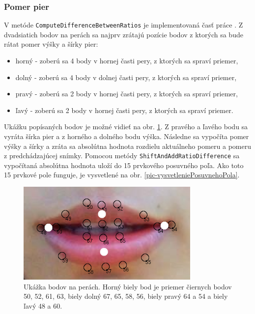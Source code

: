 \subsubsection{Pomer pier}\label{pomerPier}
V metóde \texttt{ComputeDifferenceBetweenRatios} je implementovaná časť práce \cite{aoki2007voice}.
Z dvadsiatich bodov na perách sa najprv zrátajú pozície bodov z ktorých sa bude rátat pomer výšky a šírky pier:
\begin{itemize}
\item horný - zoberú sa 4 body v hornej časti pery, z ktorých sa spraví priemer,
\item dolný - zoberú sa 4 body v dolnej časti pery, z ktorých sa spraví priemer,
\item pravý - zoberú sa 2 body v hornej časti pery, z ktorých sa spraví priemer,
\item ľavý - zoberú sa 2 body v hornej časti pery, z ktorých sa spraví priemer.
\end{itemize} 
Ukážku popísaných bodov je možné vidieť na obr. \ref{pic-bodyPomeru}.
Z pravého a ľavého bodu sa vyráta šírka pier a z horného a dolného bodu výška.
Následne sa vypočíta pomer výšky a šírky a zráta sa absolútna hodnota rozdielu aktuálneho pomeru a pomeru z predchádzajúcej snímky. 
Pomocou metódy \texttt{ShiftAndAddRatioDifference} sa vypočítaná absolútna hodnota uloží do 15 prvkového posuvného poľa.
Ako toto 15 prvkové pole funguje, je vysvetlené na obr. \ref{pic-vysvetleniePosuvnehoPola}.

\begin{figure}[H]
	\begin{center}
		\includegraphics[height=5cm]{pics/peryBodyUpravene.png}
		\caption{Ukážka bodov na perách. Horný biely bod je priemer čiernych bodov 50, 52, 61, 63, biely dolný 67, 65, 58, 56, biely pravý 64 a 54 a biely ľavý 48 a 60.}
		\label{pic-bodyPomeru}
	\end{center}
\end{figure}

